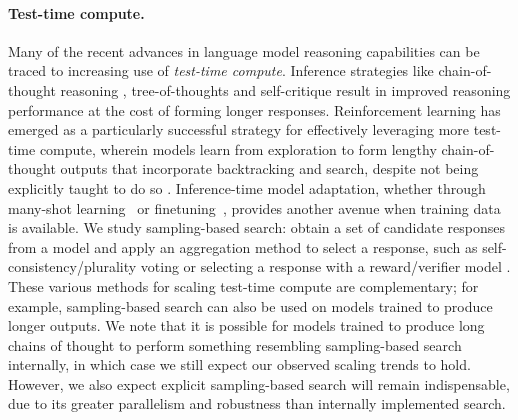 \paragraph{Test-time compute.}
Many of the recent advances in language model reasoning capabilities can be traced to increasing use of \textit{test-time compute}.
Inference strategies like chain-of-thought reasoning \citep{DBLP:conf/nips/Wei0SBIXCLZ22}, tree-of-thoughts \citep{DBLP:conf/nips/YaoYZS00N23} and self-critique  \citep{valmeekam2023largelanguagemodelsreally} result in improved reasoning performance at the cost of forming longer responses.
Reinforcement learning has emerged as a particularly successful strategy for effectively leveraging more test-time compute, wherein models learn from exploration to form lengthy chain-of-thought outputs that incorporate backtracking and search, despite not being explicitly taught to do so \citep{o1-preview, deepseekai2025deepseekr1incentivizingreasoningcapability}.
Inference-time model adaptation, whether through many-shot learning~\citep{agarwal2024manyshotincontextlearning, anil2024jailbreaking} or finetuning~\citep{akyurek2024surprisingeffectivenesstesttimetraining}, provides another avenue when training data is available.
We study sampling-based search: obtain a set of candidate responses from a model and apply an aggregation method to select a response, such as self-consistency/plurality voting \citep{DBLP:conf/iclr/0002WSLCNCZ23} or selecting a response with a reward/verifier model \citep{cobbe_training_2021}.
These various methods for scaling test-time compute are complementary; for example, sampling-based search can also be used on models trained to produce longer outputs.
We note that it is possible for models trained to produce long chains of thought to perform something resembling sampling-based search internally, in which case we still expect our observed scaling trends to hold.
However, we also expect explicit sampling-based search will remain indispensable, due to its greater parallelism and robustness than internally implemented search.

